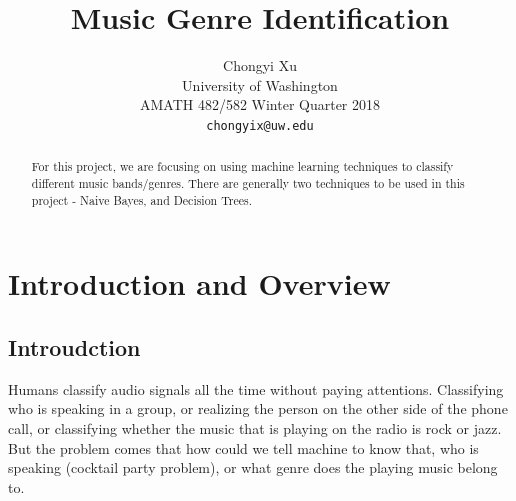 \documentclass[twoside,twocolumn]{article}
\title{\LARGE \bf
    Music Genre Identification
    }
\author{ \parbox{3 in}{\centering Chongyi Xu \\
             University of Washington\\
             AMATH 482/582 Winter Quarter 2018\\
             {\tt\small chongyix@uw.edu}}
    }
\begin{document}
    \maketitle

    \begin{abstract}

    For this project, we are focusing on using machine learning techniques to classify
    different music bands/genres. There are generally two techniques to be used in this project - 
    Naive Bayes, and Decision Trees.
        
    \end{abstract}

    \linespread{1.05} %
    \section{Introduction and Overview}
    \subsection{Introudction}
    Humans classify audio signals all the time without paying attentions. Classifying who is speaking in a group, or 
    realizing the person on the other side of the phone call, or classifying whether the music that is playing on the 
    radio is rock or jazz. But the problem comes that how could we tell machine to know that, who is speaking (cocktail
    party problem), or what genre does the playing music belong to.

\end{document}
